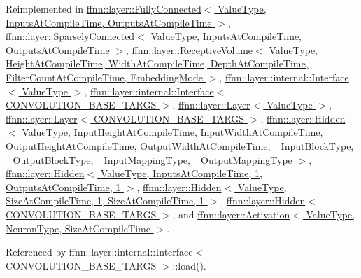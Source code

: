 Reimplemented in \hyperlink{classffnn_1_1layer_1_1_fully_connected_a4d449a95d01e3ad04a7813d70d296e0c}{ffnn\-::layer\-::\-Fully\-Connected$<$ Value\-Type, Inputs\-At\-Compile\-Time, Outputs\-At\-Compile\-Time $>$}, \hyperlink{classffnn_1_1layer_1_1_sparsely_connected_a0996cd78dc2f76cab36fac2ec5c8f323}{ffnn\-::layer\-::\-Sparsely\-Connected$<$ Value\-Type, Inputs\-At\-Compile\-Time, Outputs\-At\-Compile\-Time $>$}, \hyperlink{classffnn_1_1layer_1_1_receptive_volume_aebfd8f149057b061d6880669376175e3}{ffnn\-::layer\-::\-Receptive\-Volume$<$ Value\-Type, Height\-At\-Compile\-Time, Width\-At\-Compile\-Time, Depth\-At\-Compile\-Time, Filter\-Count\-At\-Compile\-Time, Embedding\-Mode $>$}, \hyperlink{classffnn_1_1layer_1_1internal_1_1_interface_a88b5bd86aafd361d3a84dc6cba211195}{ffnn\-::layer\-::internal\-::\-Interface$<$ Value\-Type $>$}, \hyperlink{classffnn_1_1layer_1_1internal_1_1_interface_a88b5bd86aafd361d3a84dc6cba211195}{ffnn\-::layer\-::internal\-::\-Interface$<$ C\-O\-N\-V\-O\-L\-U\-T\-I\-O\-N\-\_\-\-B\-A\-S\-E\-\_\-\-T\-A\-R\-G\-S $>$}, \hyperlink{classffnn_1_1layer_1_1_layer_a23f5f3c958d888632010327471c7b012}{ffnn\-::layer\-::\-Layer$<$ Value\-Type $>$}, \hyperlink{classffnn_1_1layer_1_1_layer_a23f5f3c958d888632010327471c7b012}{ffnn\-::layer\-::\-Layer$<$ C\-O\-N\-V\-O\-L\-U\-T\-I\-O\-N\-\_\-\-B\-A\-S\-E\-\_\-\-T\-A\-R\-G\-S $>$}, \hyperlink{classffnn_1_1layer_1_1_hidden_a696f61b2d9b661b7a8d6bdb3dc32b536}{ffnn\-::layer\-::\-Hidden$<$ Value\-Type, Input\-Height\-At\-Compile\-Time, Input\-Width\-At\-Compile\-Time, Output\-Height\-At\-Compile\-Time, Output\-Width\-At\-Compile\-Time, \-\_\-\-Input\-Block\-Type, \-\_\-\-Output\-Block\-Type, \-\_\-\-Input\-Mapping\-Type, \-\_\-\-Output\-Mapping\-Type $>$}, \hyperlink{classffnn_1_1layer_1_1_hidden_a696f61b2d9b661b7a8d6bdb3dc32b536}{ffnn\-::layer\-::\-Hidden$<$ Value\-Type, Inputs\-At\-Compile\-Time, 1, Outputs\-At\-Compile\-Time, 1 $>$}, \hyperlink{classffnn_1_1layer_1_1_hidden_a696f61b2d9b661b7a8d6bdb3dc32b536}{ffnn\-::layer\-::\-Hidden$<$ Value\-Type, Size\-At\-Compile\-Time, 1, Size\-At\-Compile\-Time, 1 $>$}, \hyperlink{classffnn_1_1layer_1_1_hidden_a696f61b2d9b661b7a8d6bdb3dc32b536}{ffnn\-::layer\-::\-Hidden$<$ C\-O\-N\-V\-O\-L\-U\-T\-I\-O\-N\-\_\-\-B\-A\-S\-E\-\_\-\-T\-A\-R\-G\-S $>$}, and \hyperlink{classffnn_1_1layer_1_1_activation_a045ecc330b67cdc3a41d6d7fc3a8dbf2}{ffnn\-::layer\-::\-Activation$<$ Value\-Type, Neuron\-Type, Size\-At\-Compile\-Time $>$}.



Referenced by ffnn\-::layer\-::internal\-::\-Interface$<$ C\-O\-N\-V\-O\-L\-U\-T\-I\-O\-N\-\_\-\-B\-A\-S\-E\-\_\-\-T\-A\-R\-G\-S $>$\-::load().

